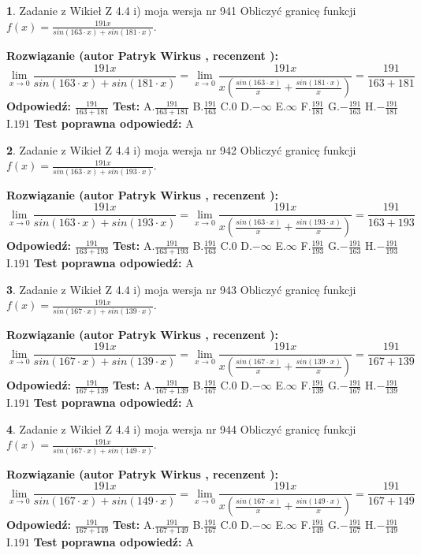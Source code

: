 \documentclass[12pt, a4paper]{article}
\theoremstyle{definition} %
\newtheorem{zad}{}
\newcommand{\zadStart}[1]{\begin{zad}#1\newline}
\newcommand{\zadStop}{\end{zad}}
\newcommand{\rozwStart}[2]{\noindent \textbf{Rozwiązanie (autor #1 , recenzent #2): }\newline}
\newcommand{\rozwStop}{\newline}
\newcommand{\odpStart}{\noindent \textbf{Odpowiedź:}\newline}
\newcommand{\odpStop}{\newline}
\newcommand{\testStart}{\noindent \textbf{Test:}\newline}
\newcommand{\testStop}{\newline}
\newcommand{\kluczStart}{\noindent \textbf{Test poprawna odpowiedź:}\newline}
\newcommand{\kluczStop}{\newline}
\begin{document}
\zadStart{Zadanie z Wikieł Z 4.4 i) moja wersja nr 941}
Obliczyć granicę funkcji $f(x)=\frac{191x}{sin(163\cdot x) +sin(181\cdot x)}$.
\zadStop
\rozwStart{Patryk Wirkus}{}
$$\lim\limits_{x\to 0}\frac{191x}{sin(163\cdot x) +sin(181\cdot x)}=\lim\limits_{x\to 0}\frac{191x}{x(\frac{sin(163\cdot x)}{x}+\frac{sin(181\cdot x)}{x})}=\frac{191}{163+181}$$
\rozwStop
\odpStart
$\frac{191}{163+181}$
\odpStop
\testStart
A.$\frac{191}{163+181}$
B.$\frac{191}{163}$
C.$0$
D.$-\infty$
E.$\infty$
F.$\frac{191}{181}$
G.$-\frac{191}{163}$
H.$-\frac{191}{181}$
I.$191$
\testStop
\kluczStart
A
\kluczStop



\zadStart{Zadanie z Wikieł Z 4.4 i) moja wersja nr 942}
Obliczyć granicę funkcji $f(x)=\frac{191x}{sin(163\cdot x) +sin(193\cdot x)}$.
\zadStop
\rozwStart{Patryk Wirkus}{}
$$\lim\limits_{x\to 0}\frac{191x}{sin(163\cdot x) +sin(193\cdot x)}=\lim\limits_{x\to 0}\frac{191x}{x(\frac{sin(163\cdot x)}{x}+\frac{sin(193\cdot x)}{x})}=\frac{191}{163+193}$$
\rozwStop
\odpStart
$\frac{191}{163+193}$
\odpStop
\testStart
A.$\frac{191}{163+193}$
B.$\frac{191}{163}$
C.$0$
D.$-\infty$
E.$\infty$
F.$\frac{191}{193}$
G.$-\frac{191}{163}$
H.$-\frac{191}{193}$
I.$191$
\testStop
\kluczStart
A
\kluczStop



\zadStart{Zadanie z Wikieł Z 4.4 i) moja wersja nr 943}
Obliczyć granicę funkcji $f(x)=\frac{191x}{sin(167\cdot x) +sin(139\cdot x)}$.
\zadStop
\rozwStart{Patryk Wirkus}{}
$$\lim\limits_{x\to 0}\frac{191x}{sin(167\cdot x) +sin(139\cdot x)}=\lim\limits_{x\to 0}\frac{191x}{x(\frac{sin(167\cdot x)}{x}+\frac{sin(139\cdot x)}{x})}=\frac{191}{167+139}$$
\rozwStop
\odpStart
$\frac{191}{167+139}$
\odpStop
\testStart
A.$\frac{191}{167+139}$
B.$\frac{191}{167}$
C.$0$
D.$-\infty$
E.$\infty$
F.$\frac{191}{139}$
G.$-\frac{191}{167}$
H.$-\frac{191}{139}$
I.$191$
\testStop
\kluczStart
A
\kluczStop



\zadStart{Zadanie z Wikieł Z 4.4 i) moja wersja nr 944}
Obliczyć granicę funkcji $f(x)=\frac{191x}{sin(167\cdot x) +sin(149\cdot x)}$.
\zadStop
\rozwStart{Patryk Wirkus}{}
$$\lim\limits_{x\to 0}\frac{191x}{sin(167\cdot x) +sin(149\cdot x)}=\lim\limits_{x\to 0}\frac{191x}{x(\frac{sin(167\cdot x)}{x}+\frac{sin(149\cdot x)}{x})}=\frac{191}{167+149}$$
\rozwStop
\odpStart
$\frac{191}{167+149}$
\odpStop
\testStart
A.$\frac{191}{167+149}$
B.$\frac{191}{167}$
C.$0$
D.$-\infty$
E.$\infty$
F.$\frac{191}{149}$
G.$-\frac{191}{167}$
H.$-\frac{191}{149}$
I.$191$
\testStop
\kluczStart
A
\kluczStop
\end{document}
